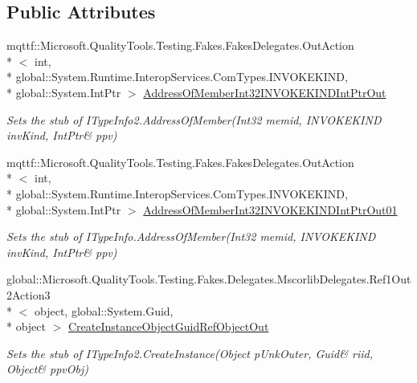 \subsection*{Public Attributes}
\begin{DoxyCompactItemize}
\item 
mqttf\-::\-Microsoft.\-Quality\-Tools.\-Testing.\-Fakes.\-Fakes\-Delegates.\-Out\-Action\\*
$<$ int, \\*
global\-::\-System.\-Runtime.\-Interop\-Services.\-Com\-Types.\-I\-N\-V\-O\-K\-E\-K\-I\-N\-D, \\*
global\-::\-System.\-Int\-Ptr $>$ \hyperlink{class_system_1_1_runtime_1_1_interop_services_1_1_com_types_1_1_fakes_1_1_stub_i_type_info2_a27aede40fe4360486883aad4249a712c}{Address\-Of\-Member\-Int32\-I\-N\-V\-O\-K\-E\-K\-I\-N\-D\-Int\-Ptr\-Out}
\begin{DoxyCompactList}\small\item\em Sets the stub of I\-Type\-Info2.\-Address\-Of\-Member(Int32 memid, I\-N\-V\-O\-K\-E\-K\-I\-N\-D inv\-Kind, Int\-Ptr\& ppv)\end{DoxyCompactList}\item 
mqttf\-::\-Microsoft.\-Quality\-Tools.\-Testing.\-Fakes.\-Fakes\-Delegates.\-Out\-Action\\*
$<$ int, \\*
global\-::\-System.\-Runtime.\-Interop\-Services.\-Com\-Types.\-I\-N\-V\-O\-K\-E\-K\-I\-N\-D, \\*
global\-::\-System.\-Int\-Ptr $>$ \hyperlink{class_system_1_1_runtime_1_1_interop_services_1_1_com_types_1_1_fakes_1_1_stub_i_type_info2_a9bf28348cde9a7514a972fb3d86d4a76}{Address\-Of\-Member\-Int32\-I\-N\-V\-O\-K\-E\-K\-I\-N\-D\-Int\-Ptr\-Out01}
\begin{DoxyCompactList}\small\item\em Sets the stub of I\-Type\-Info.\-Address\-Of\-Member(Int32 memid, I\-N\-V\-O\-K\-E\-K\-I\-N\-D inv\-Kind, Int\-Ptr\& ppv)\end{DoxyCompactList}\item 
global\-::\-Microsoft.\-Quality\-Tools.\-Testing.\-Fakes.\-Delegates.\-Mscorlib\-Delegates.\-Ref1\-Out2\-Action3\\*
$<$ object, global\-::\-System.\-Guid, \\*
object $>$ \hyperlink{class_system_1_1_runtime_1_1_interop_services_1_1_com_types_1_1_fakes_1_1_stub_i_type_info2_a15012eb8492f630ff0679d9bf7d2f574}{Create\-Instance\-Object\-Guid\-Ref\-Object\-Out}
\begin{DoxyCompactList}\small\item\em Sets the stub of I\-Type\-Info2.\-Create\-Instance(Object p\-Unk\-Outer, Guid\& riid, Object\& ppv\-Obj)\end{DoxyCompactList}\item 

\end{DoxyCompactItemize}
